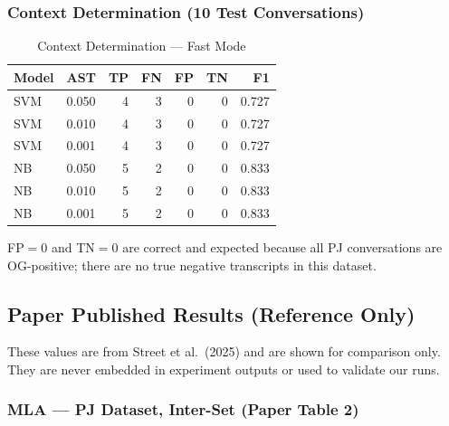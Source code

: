\documentclass[12pt,a4paper]{article}
\begin{document}
\subsubsection{Context Determination (10 Test Conversations)}

\begin{table}[H]
  \centering
  \caption{Context Determination --- Fast Mode}
  \begin{tabular}{llrrrrr}
    \toprule
    \textbf{Model} & \textbf{AST} & \textbf{TP} & \textbf{FN} &
    \textbf{FP} & \textbf{TN} & \textbf{F1} \\
    \midrule
    SVM & 0.050 & 4 & 3 & 0 & 0 & 0.727 \\
    SVM & 0.010 & 4 & 3 & 0 & 0 & 0.727 \\
    SVM & 0.001 & 4 & 3 & 0 & 0 & 0.727 \\
    \addlinespace
    NB  & 0.050 & 5 & 2 & 0 & 0 & 0.833 \\
    NB  & 0.010 & 5 & 2 & 0 & 0 & 0.833 \\
    NB  & 0.001 & 5 & 2 & 0 & 0 & 0.833 \\
    \bottomrule
  \end{tabular}
  \label{tab:ctx_fast}
\end{table}

FP$=0$ and TN$=0$ are correct and expected because all PJ conversations
are OG-positive; there are no true negative transcripts in this dataset.

\subsection{Paper Published Results (Reference Only)}
\label{sec:paper_results}

\begin{cautionbox}
These values are from Street et al.\ (2025) and are shown for comparison
only. They are never embedded in experiment outputs or used to validate
our runs.
\end{cautionbox}

\subsubsection{MLA --- PJ Dataset, Inter-Set (Paper Table 2)}
\end{document}
